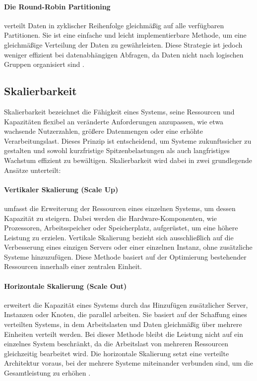     \paragraph{Die Round-Robin Partitioning} verteilt Daten in zyklischer Reihenfolge gleichmäßig auf alle verfügbaren Partitionen. Sie ist eine einfache und leicht implementierbare Methode, um eine gleichmäßige Verteilung der Daten zu gewährleisten. Diese Strategie ist jedoch weniger effizient bei datenabhängigen Abfragen, da Daten nicht nach logischen Gruppen organisiert sind \cite{g4g-partitioning}.




\subsection{Skalierbarkeit}

Skalierbarkeit bezeichnet die Fähigkeit eines Systems, seine Ressourcen und Kapazitäten flexibel an veränderte Anforderungen anzupassen, wie etwa wachsende Nutzerzahlen, größere Datenmengen oder eine erhöhte Verarbeitungslast. Dieses Prinzip ist entscheidend, um Systeme zukunftssicher zu gestalten und sowohl kurzfristige Spitzenbelastungen als auch langfristiges Wachstum effizient zu bewältigen. Skalierbarkeit wird dabei in zwei grundlegende Ansätze unterteilt: 

    \paragraph{Vertikaler Skalierung (Scale Up)} umfasst die Erweiterung der Ressourcen eines einzelnen Systems, um dessen Kapazität zu steigern. Dabei werden die Hardware-Komponenten, wie Prozessoren, Arbeitsspeicher oder Speicherplatz, aufgerüstet, um eine höhere Leistung zu erzielen. Vertikale Skalierung bezieht sich ausschließlich auf die Verbesserung eines einzigen Servers oder einer einzelnen Instanz, ohne zusätzliche Systeme hinzuzufügen. Diese Methode basiert auf der Optimierung bestehender Ressourcen innerhalb einer zentralen Einheit.
    \paragraph{Horizontale Skalierung (Scale Out)} erweitert die Kapazität eines Systems durch das Hinzufügen zusätzlicher Server, Instanzen oder Knoten, die parallel arbeiten. Sie basiert auf der Schaffung eines verteilten Systems, in dem Arbeitslasten und Daten gleichmäßig über mehrere Einheiten verteilt werden. Bei dieser Methode bleibt die Leistung nicht auf ein einzelnes System beschränkt, da die Arbeitslast von mehreren Ressourcen gleichzeitig bearbeitet wird. Die horizontale Skalierung setzt eine verteilte Architektur voraus, bei der mehrere Systeme miteinander verbunden sind, um die Gesamtleistung zu erhöhen \cite{ibm-scaling}.

